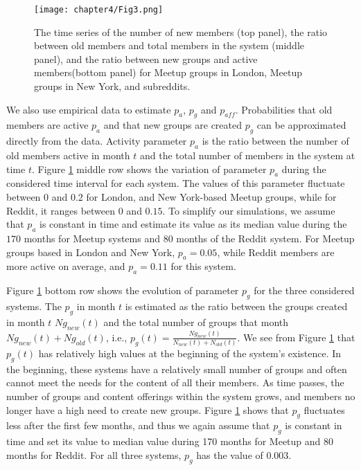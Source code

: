 \begin{figure}[h]
	\centering
	\texttt{[image: chapter4/Fig3.png]}
	\caption[The estimation of the model parameters for a groups growth model.]{The time series of the number of new members (top panel), the ratio between old members and total members in the system (middle panel), and the ratio between new groups and active members(bottom panel) for Meetup groups in London,  Meetup groups in New York, and subreddits. }
	\label{fig:fig5}
\end{figure}

We also use empirical data to estimate $p_{a}$, $p_{g}$ and $p_{aff}$. Probabilities that old members are active $p_a$ and that new groups are created $p_g$ can be approximated directly from the data. Activity parameter $p_{a}$ is the ratio between the number of old members active in month $t$ and the total number of members in the system at time $t$. Figure \ref{fig:fig5} middle row shows the variation of parameter $p_{a}$ during the considered time interval for each system. The values of this parameter fluctuate between $0$ and $0.2$ for London, and New York-based Meetup groups, while for Reddit, it ranges between $0$ and $0.15$.
To simplify our simulations, we assume that $p_{a}$ is constant in time and estimate its value as its median value during the $170$ months for Meetup systems and $80$ months of the Reddit system. For Meetup groups based in London and New York, $p_{a}=0.05$, while Reddit members are more active on average, and $p_{a}=0.11$ for this system.

Figure \ref{fig:fig5} bottom row shows the evolution of parameter $p_{g}$ for the three considered systems. The $p_{g}$ in month $t$ is estimated as the ratio between the groups created in month $t$ $Ng_{new}(t)$ and the total number of groups that month $Ng_{new}(t)+Ng_{old}(t)$, i.e., $p_{g}(t)=\frac{Ng_{new}(t)}{N_{new}(t)+N_{old}(t)}$. We see from Figure \ref{fig:fig5} that $p_{g}(t)$ has relatively high values at the beginning of the system's existence. In the beginning, these systems have a relatively small number of groups and often cannot meet the needs for the content of all their members. As time passes, the number of groups and content offerings within the system grows, and members no longer have a high need to create new groups. Figure \ref{fig:fig5} shows that $p_{g}$ fluctuates less after the first few months, and thus we again assume that $p_{g}$ is constant in time and set its value to median value during 170 months for Meetup and 80 months for Reddit. For all three systems, $p_{g}$ has the value of $0.003$.


